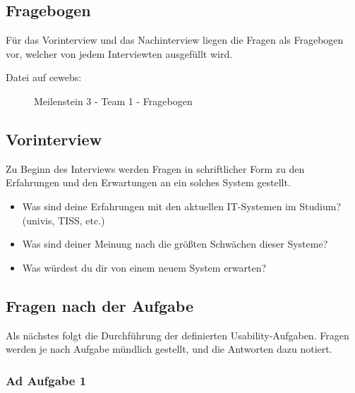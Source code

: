 \documentclass[a4paper,10pt]{scrartcl}
\begin{document}
\subsection{Fragebogen}

Für das Vorinterview und das Nachinterview liegen die Fragen als Fragebogen vor, welcher von jedem Interviewten ausgefüllt wird.

\begin{description}
 \item[Datei auf cewebs:]Meilenstein 3 - Team 1 - Fragebogen
\end{description}

\subsection{Vorinterview}

Zu Beginn des Interviews werden Fragen in schriftlicher Form zu den Erfahrungen und den Erwartungen an ein solches System gestellt.

\begin{itemize}
 \item Was sind deine Erfahrungen mit den aktuellen IT-Systemen im Studium? (univis, TISS, etc.)
 \item Was sind deiner Meinung nach die größten Schwächen dieser Systeme?
 \item Was würdest du dir von einem neuem System erwarten?
\end{itemize}

\subsection{Fragen nach der Aufgabe}

Als nächstes folgt die Durchführung der definierten Usability-Aufgaben. Fragen werden je nach Aufgabe mündlich gestellt, und die Antworten dazu notiert.

\subsubsection*{Ad Aufgabe 1}
\end{document}
